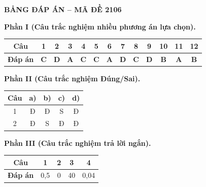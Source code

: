 \vspace{0.4cm}
\noindent\begin{minipage}{\linewidth}
\begin{center}{\large\bfseries\color{red!80!black} BẢNG ĐÁP ÁN -- MÃ ĐỀ 2106}\end{center}
\vspace{0.15cm}
\noindent\textbf{Phần I (Câu trắc nghiệm nhiều phương án lựa chọn).}\par\smallskip
\begin{center}
\begin{tabular}{|c|c|c|c|c|c|c|c|c|c|c|c|c|}\hline
\textbf{Câu} & 1 & 2 & 3 & 4 & 5 & 6 & 7 & 8 & 9 & 10 & 11 & 12 \\ \hline
\textbf{Đáp án} & \textbf{C} & \textbf{D} & \textbf{A} & \textbf{C} & \textbf{C} & \textbf{A} & \textbf{D} & \textbf{C} & \textbf{D} & \textbf{B} & \textbf{A} & \textbf{B} \\ \hline
\end{tabular}
\end{center}
\noindent\textbf{Phần II (Câu trắc nghiệm Đúng/Sai).}\par\smallskip
\begin{center}
\begin{tabular}{|c|c|c|c|c|}\hline
\textbf{Câu} & \textbf{a)} & \textbf{b)} & \textbf{c)} & \textbf{d)} \\ \hline
1 & Đ & Đ & S & Đ \\ \hline
2 & Đ & S & Đ & Đ \\ \hline
\end{tabular}
\end{center}
\noindent\textbf{Phần III (Câu trắc nghiệm trả lời ngắn).}\par\smallskip
\begin{center}
\begin{tabular}{|c|c|c|c|c|}\hline
\textbf{Câu} & 1 & 2 & 3 & 4 \\ \hline
\textbf{Đáp án} & 0,5 & 0 & 40 & 0,04 \\ \hline
\end{tabular}
\end{center}
\end{minipage}
